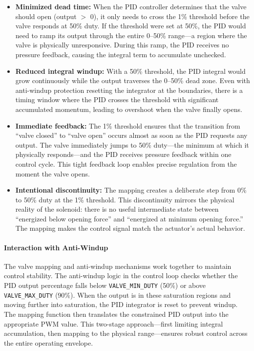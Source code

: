 \documentclass[12pt,a4paper]{article}
\begin{document}
\begin{itemize}
    \item \textbf{Minimized dead time:} When the PID controller determines that the valve should open (output $>$ 0), it only needs to cross the 1\% threshold before the valve responds at 50\% duty. If the threshold were set at 50\%, the PID would need to ramp its output through the entire 0--50\% range---a region where the valve is physically unresponsive. During this ramp, the PID receives no pressure feedback, causing the integral term to accumulate unchecked.
    
    \item \textbf{Reduced integral windup:} With a 50\% threshold, the PID integral would grow continuously while the output traverses the 0--50\% dead zone. Even with anti-windup protection resetting the integrator at the boundaries, there is a timing window where the PID crosses the threshold with significant accumulated momentum, leading to overshoot when the valve finally opens.
    
    \item \textbf{Immediate feedback:} The 1\% threshold ensures that the transition from ``valve closed'' to ``valve open'' occurs almost as soon as the PID requests any output. The valve immediately jumps to 50\% duty---the minimum at which it physically responds---and the PID receives pressure feedback within one control cycle. This tight feedback loop enables precise regulation from the moment the valve opens.
    
    \item \textbf{Intentional discontinuity:} The mapping creates a deliberate step from 0\% to 50\% duty at the 1\% threshold. This discontinuity mirrors the physical reality of the solenoid: there is no useful intermediate state between ``energized below opening force'' and ``energized at minimum opening force.'' The mapping makes the control signal match the actuator's actual behavior.
\end{itemize}

\paragraph{Interaction with Anti-Windup}
The valve mapping and anti-windup mechanisms work together to maintain control stability. The anti-windup logic in the control loop checks whether the PID output percentage falls below \texttt{VALVE\_MIN\_DUTY} (50\%) or above \texttt{VALVE\_MAX\_DUTY} (90\%). When the output is in these saturation regions and moving further into saturation, the PID integrator is reset to prevent windup. The mapping function then translates the constrained PID output into the appropriate PWM value. This two-stage approach---first limiting integral accumulation, then mapping to the physical range---ensures robust control across the entire operating envelope.
\end{document}
